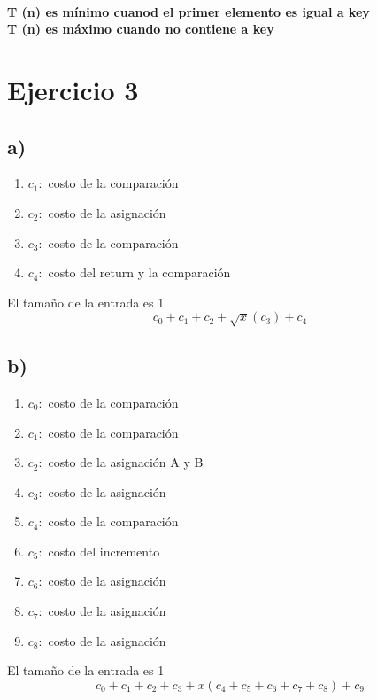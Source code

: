 \documentclass[10pt,a4paper]{article}
\begin{document}
            \paragraph{
                T (n) es m\'inimo cuanod el primer elemento es igual a key \\
                T (n) es m\'aximo cuando no contiene a key
                }
    \section{Ejercicio 3}
        \subsection{a)}
            \begin{enumerate}
             \item $c_{1}:$ costo de la comparación
             \item $c_{2}:$ costo de la asignación
             \item $c_{3}:$ costo de la comparación
             \item $c_{4}:$ costo del return y la comparación
            \end{enumerate}

            El tama\~no de la entrada es 1
            \[ c_{0} + c_{1} + c_{2} + \sqrt{x}\left( c_{3}\right) +c_{4}\]
        \subsection{b)}
            \begin{enumerate}
                \item $c_{0}:$ costo de la comparación
                \item $c_{1}:$ costo de la comparación
                \item $c_{2}:$ costo de la asignación A y B
                \item $c_{3}:$ costo de la asignación
                \item $c_{4}:$ costo de la comparación
                \item $c_{5}:$ costo del incremento
                \item $c_{6}:$ costo de la asignación
                \item $c_{7}:$ costo de la asignación
                \item $c_{8}:$ costo de la asignación
            \end{enumerate}
           El tama\~no de la entrada es 1
           \[ c_{0} + c_{1} + c_{2} + c_{3} +  x ( c_{4} + c_{5} + c_{6} +c_{7} + c_{8}) + c_{9} \]
            
\end{document}
